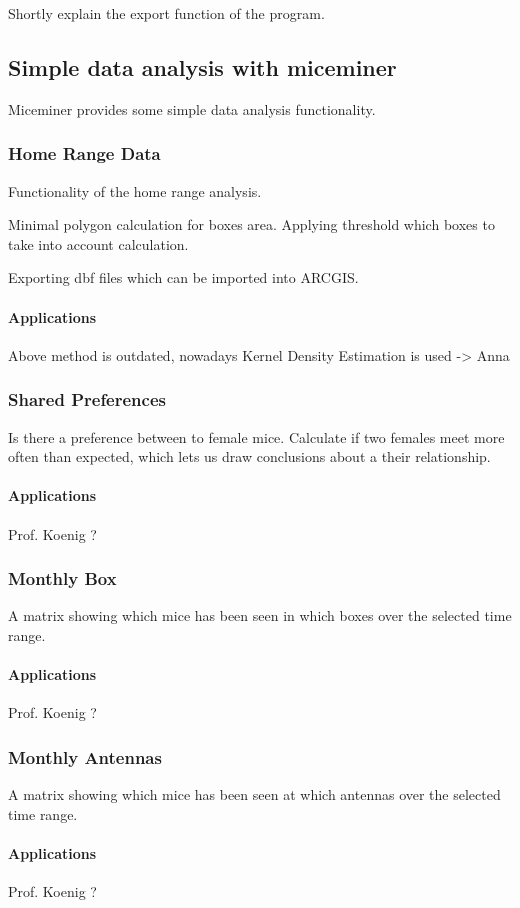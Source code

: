 Shortly explain the export function of the program.

\subsection{Simple data analysis with miceminer}
\label{subsec:dataana} 

Miceminer provides some simple data analysis functionality.

\subsubsection{Home Range Data}
\label{subsubsec:homerangedata} 

Functionality of the home range analysis.

Minimal polygon calculation for boxes area.
Applying threshold which boxes to take into account calculation. 

Exporting dbf files which can be imported into ARCGIS.

\paragraph{Applications}
Above method is outdated, nowadays Kernel Density Estimation is used -> Anna

\subsubsection{Shared Preferences}
\label{subsubsec:sharedpref} 

Is there a preference between to female mice.
Calculate if two females meet more often than expected, which lets us draw conclusions about a their relationship.

\paragraph{Applications}
Prof. Koenig ?

\subsubsection{Monthly Box}
\label{subsubsec:monthbox}

A matrix  showing which mice has been seen in which boxes over the selected time range.

\paragraph{Applications}
Prof. Koenig ?

\subsubsection{Monthly Antennas}
\label{subsubsec:monthant}

A matrix  showing which mice has been seen at which antennas over the selected time range.

\paragraph{Applications}
Prof. Koenig ?
